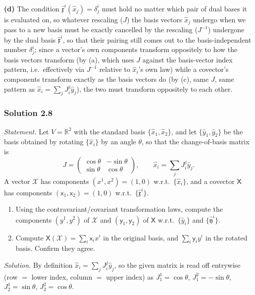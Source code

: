 \documentclass[11pt]{article}
\begin{document}
\textbf{(d)} The condition $\hat{\mathfrak x}^i(\hat x_j)=\delta^i_j$ must hold no matter which pair of dual bases it is evaluated on, so whatever rescaling ($J$) the basis vectors $\hat x_j$ undergo when we pass to a new basis must be exactly cancelled by the rescaling ($J^{-1}$) undergone by the dual basis $\hat{\mathfrak x}^i$, so that their pairing still comes out to the basis-independent number $\delta^i_j$; since a vector's own components transform oppositely to how the basis vectors transform (by (a), which uses $J$ against the basis-vector index pattern, i.e.\ effectively via $J^{-1}$ relative to $\hat x_i$'s own law) while a covector's components transform exactly as the basis vectors do (by (c), same $J$, same pattern as $\hat x_i=\sum_jJ_i^j\hat y_j$), the two must transform oppositely to each other.

\subsubsection*{Solution 2.8}

\noindent\textit{Statement.}
Let $V = \mathbb{R}^2$ with the standard basis $\{\hat{x}_1,\hat{x}_2\}$, and let $\{\hat{y}_1,\hat{y}_2\}$ be the basis obtained by rotating $\{\hat{x}_i\}$ by an angle $\theta$, so that the change-of-basis matrix is
\[
J = \begin{pmatrix} \cos\theta & -\sin\theta \\ \sin\theta & \cos\theta \end{pmatrix}, \qquad \hat{x}_i = \sum_j J_i^j \hat{y}_j.
\]
A vector $\mathcal{X}$ has components $(x^1,x^2) = (1,0)$ w.r.t.\ $\{\hat{x}_i\}$, and a covector $\mathsf{X}$ has components $(\mathsf{x}_1,\mathsf{x}_2) = (1,0)$ w.r.t.\ $\{\hat{\mathfrak{x}}^i\}$.
\begin{enumerate}[label=(\alph*)]
  \item Using the contravariant/covariant transformation laws, compute the components $(y^1,y^2)$ of $\mathcal{X}$ and $(\mathsf{y}_1,\mathsf{y}_2)$ of $\mathsf{X}$ w.r.t.\ $\{\hat{y}_i\}$ and $\{\hat{\mathfrak{y}}^i\}$.
  \item Compute $\mathsf{X}(\mathcal{X}) = \sum_i \mathsf{x}_i x^i$ in the original basis, and $\sum_i \mathsf{y}_i y^i$ in the rotated basis. Confirm they agree.
\end{enumerate}

\medskip
\noindent\textit{Solution.} By definition $\hat x_i=\sum_jJ_i^j\hat y_j$, so the given matrix is read off entrywise (row $=$ lower index, column $=$ upper index) as $J_1^1=\cos\theta$, $J_1^2=-\sin\theta$, $J_2^1=\sin\theta$, $J_2^2=\cos\theta$.
\end{document}
